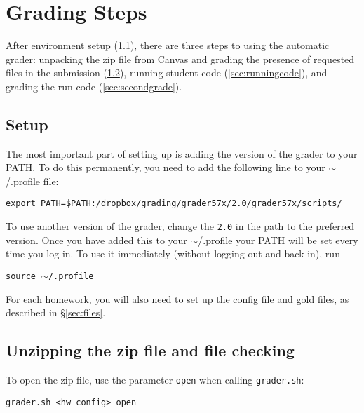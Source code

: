 \documentclass[12pt]{article}
\begin{document}
\section{Grading Steps} \label{sec:autograder}

After environment setup (\ref{sec:setup}), there are three steps to using the automatic grader: unpacking the zip file from Canvas and grading the presence of requested files in the submission (\ref{sec:unzipping}), running student code (\ref{sec:runningcode}), and grading the run code (\ref{sec:secondgrade}).

\subsection{Setup} \label{sec:setup}

The most important part of setting up is adding the version of the grader to your PATH. To do this permanently, you need to add the following line to your $\sim$/.profile file:

\vspace{5pt}

\texttt{export PATH=\$PATH:/dropbox/grading/grader57x/2.0/grader57x/scripts/}

\vspace{5pt}

To use another version of the grader, change the \texttt{2.0} in the path to the preferred version. Once you have added this to your $\sim$/.profile your PATH will be set every time you log in. To use it immediately (without logging out and back in), run

\vspace{5pt}

\texttt{source $\sim$/.profile}

\vspace{5pt}

For each homework, you will also need to set up the config file and gold files, as described in \S\ref{sec:files}.

\subsection{Unzipping the zip file and file checking} \label{sec:unzipping}

To open the zip file, use the parameter \texttt{open} when calling \texttt{grader.sh}:

\vspace{5pt}

\texttt{grader.sh <hw\_config> open}
\end{document}

